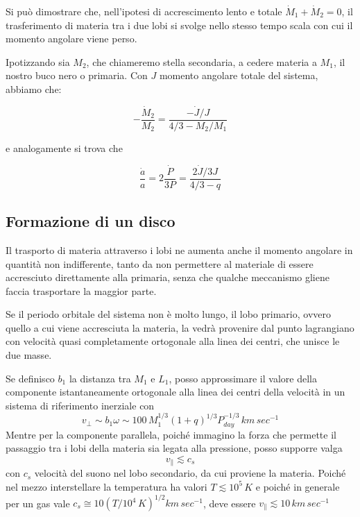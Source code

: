 \documentclass[a4paperbi]{article}
\begin{document}
	Si può dimostrare che, nell'ipotesi di accrescimento lento e totale $\dot{M}_1+\dot{M}_2=0$, il trasferimento di materia tra i due lobi si svolge nello stesso tempo scala con cui il momento angolare viene perso.
	
	Ipotizzando sia $M_2$, che chiameremo stella secondaria, a cedere materia a $M_1$, il nostro buco nero o primaria. Con $J$ momento angolare totale del sistema, abbiamo che:
	
	\begin{equation}
		-\frac{\dot{M}_2}{M_2}=\frac{-\dot{J}/J}{4/3-M_2/M_1}
	\end{equation}
	
	e analogamente si trova che

	\begin{equation}
		\frac{\dot{a}}{a}=2\frac{\dot{P}}{3P}=\frac{2\dot{J}/3J}{4/3-q}
	\end{equation}
	
\subsection{Formazione di un disco}
	Il trasporto di materia attraverso i lobi ne aumenta anche il momento angolare in quantità non indifferente, tanto da non permettere al materiale di essere accresciuto direttamente alla primaria, senza che qualche meccanismo gliene faccia trasportare la maggior parte.
	
	Se il periodo orbitale del sistema non è molto lungo, il lobo primario, ovvero quello a cui viene accresciuta la materia, la vedrà provenire dal punto lagrangiano con velocità quasi completamente ortogonale alla linea dei centri, che unisce le due masse. 
	
	Se definisco $b_1$ la distanza tra $M_1$ e $L_1$, posso approssimare il valore della componente istantaneamente ortogonale alla linea dei centri della velocità in un sistema di riferimento inerziale con
	\begin{equation}
		v_\perp\sim b_1\omega\sim 100\,M_1^{1/3}(1+q)^{1/3}P^{-1/3}_{day}\,km\,sec^{-1}
	\end{equation}  
	Mentre per la componente parallela, poiché immagino la forza che permette il passaggio tra i lobi della materia sia legata alla pressione, posso supporre valga
	\begin{equation}
		v_\parallel \lesssim c_{s}
	\end{equation}
	con $c_{s}$ velocità del suono nel lobo secondario, da cui proviene la materia. Poiché nel mezzo interstellare la temperatura ha valori $T\lesssim10^5\,K$ e poiché in generale per un gas vale $c_s\cong10(T/10^4\,K)^{1/2}km\,sec^{-1}$, deve essere $v_\parallel\lesssim10\,km\,sec^{-1}$
	
\end{document}
